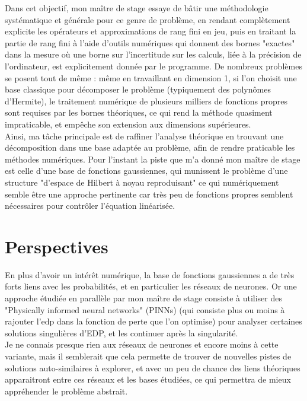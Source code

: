 \documentclass[12pt,a4paper]{article}
\begin{document}
Dans cet objectif, mon maître de stage essaye de bâtir une méthodologie systématique et générale pour ce genre de problème, en rendant complètement explicite les opérateurs et approximations de rang fini en jeu, puis en traitant la partie de rang fini à l'aide d'outils numériques qui donnent des bornes "exactes" dans la mesure où une borne sur l'incertitude sur les calculs, liée à la précision de l'ordinateur, est explicitement donnée par le programme. De nombreux problèmes se posent tout de même : même en travaillant en dimension 1, si l'on choisit une base classique pour décomposer le problème (typiquement des polynômes d'Hermite), le traitement numérique de plusieurs milliers de fonctions propres sont requises par les bornes théoriques, ce qui rend la méthode quasiment impraticable, et empêche son extension aux dimensions supérieures. \\
Ainsi, ma tâche principale est de raffiner l'analyse théorique en trouvant une décomposition dans une base adaptée au problème, afin de rendre praticable les méthodes numériques. Pour l'instant la piste que m'a donné mon maître de stage est celle d'une base de fonctions gaussiennes, qui munissent le problème d'une structure "d'espace de Hilbert à noyau reproduisant" ce qui numériquement semble être une approche pertinente car très peu de fonctions propres semblent nécessaires pour contrôler l'équation linéarisée.

\section{Perspectives}
En plus d'avoir un intérêt numérique, la base de fonctions gaussiennes a de très forts liens avec les probabilités, et en particulier les réseaux de neurones. Or une approche étudiée en parallèle par mon maître de stage consiste à utiliser des "Physically informed neural networks" (PINNs) (qui consiste plus ou moins à rajouter l'edp dans la fonction de perte que l'on optimise) pour analyser certaines solutions singulières d'EDP, et les continuer après la singularité. \\
Je ne connais presque rien aux réseaux de neurones et encore moins à cette variante, mais il semblerait que cela permette de trouver de nouvelles pistes de solutions auto-similaires à explorer, et avec un peu de chance des liens théoriques apparaitront entre ces réseaux et les bases étudiées, ce qui permettra de mieux appréhender le problème abstrait.




\newpage
\printbibliography[heading=bibintoc, title={Références}]
\end{document}
